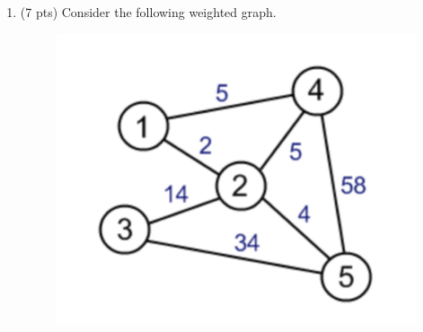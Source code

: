 \documentclass[12pt]{article}
\theoremstyle{remark}
\begin{document}
\hrulefill

\newpage
\begin{enumerate}
\item (7 pts) Consider the following weighted graph. 
\begin{figure}[h!]
\begin{center}
\includegraphics[scale=0.3]{PS5aQ1.png} 
\end{center}
\end{figure}


\end{enumerate}
\end{document}

